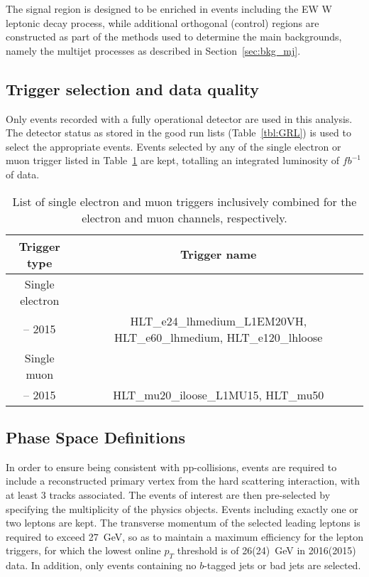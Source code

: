 
The signal region is designed to be enriched in events including the EW W leptonic decay process, while additional orthogonal (control) regions are constructed as part of the methods used to determine the main backgrounds, namely the multijet processes as described in Section~\ref{sec:bkg_mj}.

\subsection{Trigger selection and data quality}
\label{sec:event_selection_trigger_and_dataQ}

Only events recorded with a fully operational detector are used in this analysis.
The detector status as stored in the good run lists (Table~\ref{tbl:GRL}) is used to select the appropriate events.
Events selected by any of the single electron or muon trigger listed in Table~\ref{tbl:triggers} are kept, totalling an integrated luminosity of  $fb^{-1}$ of data.

\begin{table}[h]
\begin{center}
 \begin{tabular}{ | c | c | } 
 \hline
 \hline
 Trigger type & Trigger name \\
 \hline
 Single electron & \\
 -- 2015 & HLT\_e24\_lhmedium\_L1EM20VH, HLT\_e60\_lhmedium, HLT\_e120\_lhloose \\
 \hline
 \hline
 Single muon & \\
  -- 2015 & HLT\_mu20\_iloose\_L1MU15, HLT\_mu50 \\
 \hline 
\end{tabular}
\caption{
     List of single electron and muon triggers inclusively combined for the electron and muon channels, respectively.
}%
\label{tbl:triggers}
\end{center}
\end{table}

\subsection{Phase Space Definitions}
\label{sec:event_selection_phase_space}

In order to ensure being consistent with pp-collisions, events are required to include a reconstructed primary vertex from the hard scattering interaction, with at least 3 tracks associated.
The events of interest are then pre-selected by specifying the multiplicity of the physics objects.
Events including exactly one or two leptons are kept.
The transverse momentum of the selected leading leptons is required to exceed 27~GeV, so as to maintain a maximum efficiency for the lepton triggers, for which the lowest online $p_T$ threshold is of 26(24)~GeV in 2016(2015) data.
In addition, only events containing no $b$-tagged jets or bad jets are selected.


